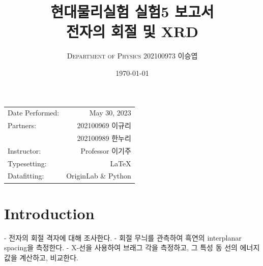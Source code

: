 \documentclass[a4paper, 10pt, nanum]{CSUniSchoolLabReport}
\title{현대물리실험 실험5 보고서 \\ 전자의 회절 및 XRD} %
\author{\textsc{Department of Physics} 202100973 이승엽}
\date{\today}
\begin{document}
\maketitle %

\begin{center}
	\begin{tabular}{l r}
		Date Performed: & May 30, 2023 \\ %
		Partners: & 202100969 이규리 \\ %
		& 202100989 한누리 \\
		Instructor: & Professor 이기주 \\ %
		Typesetting: & LaTeX \\
		Datafitting: & OriginLab \& Python \\
	\end{tabular}
\end{center}


\maketitle


\section{Introduction}

-	전자의 회절 격자에 대해 조사한다.
-	회절 무늬를 관측하여 흑연의 interplanar spacing을 측정한다.
-	X-선을 사용하여 브래그 각을 측정하고, 그 특성 동 선의 에너지 값을 계산하고, 비교한다.



\end{document}
